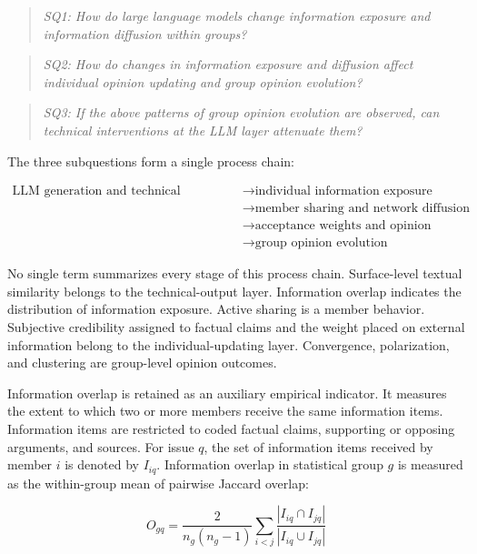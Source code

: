 \documentclass[11pt,a4paper]{article}
\begin{document}
\begin{quote}\itshape
SQ1: How do large language models change information exposure and information diffusion within groups?
\end{quote}

\begin{quote}\itshape
SQ2: How do changes in information exposure and diffusion affect individual opinion updating and group opinion evolution?
\end{quote}

\begin{quote}\itshape
SQ3: If the above patterns of group opinion evolution are observed, can technical interventions at the LLM layer attenuate them?
\end{quote}

The three subquestions form a single process chain:

\begin{equation*}
\begin{aligned}\text{LLM generation and technical configuration} &\rightarrow \text{individual information exposure} \\
&\rightarrow \text{member sharing and network diffusion} \\
&\rightarrow \text{acceptance weights and opinion updating} \\
&\rightarrow \text{group opinion evolution}\end{aligned}
\end{equation*}

No single term summarizes every stage of this process chain. Surface-level textual similarity belongs to the technical-output layer. Information overlap indicates the distribution of information exposure. Active sharing is a member behavior. Subjective credibility assigned to factual claims and the weight placed on external information belong to the individual-updating layer. Convergence, polarization, and clustering are group-level opinion outcomes.

Information overlap is retained as an auxiliary empirical indicator. It measures the extent to which two or more members receive the same information items. Information items are restricted to coded factual claims, supporting or opposing arguments, and sources. For issue $q$, the set of information items received by member $i$ is denoted by $I_{iq}$. Information overlap in statistical group $g$ is measured as the within-group mean of pairwise Jaccard overlap:

\begin{equation*}
O_{gq}
=
\frac{2}{n_g(n_g-1)}
\sum_{i<j}
\frac{|I_{iq}\cap I_{jq}|}{|I_{iq}\cup I_{jq}|}
\end{equation*}
\end{document}

